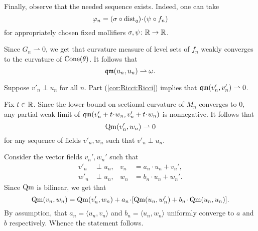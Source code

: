 Finally, observe that the needed sequence exists.
Indeed, one can take 
\[\phi_n=(\sigma\circ \dist_q)\cdot (\psi\circ f_n)\]
for appropriately chosen fixed mollifiers $\sigma,\psi\colon\mathbb{R}\to \mathbb{R}$.

Since $G_n\rightharpoonup 0$, we get that curvature measure of level sets of $f_n$ weakly converges to the curvature of $\operatorname{Cone}(\theta)$.
It follows that 
\[\operatorname{\mathfrak{qm}}(u_n,u_n)\rightharpoonup \omega.\]

Suppose $v'_n\perp u_n$ for all $n$.
Part (\ref{cor:Ricci:Ricci}) implies that  $\operatorname{\mathfrak{qm}}(v'_n,v'_n)\rightharpoonup 0$.

Fix $t\in \mathbb{R}$.
Since the lower bound on sectional curvature of $M_n$ converges to $0$, any partial weak limit of $\qm(v'_n+t\cdot w_n,v'_n+t\cdot w_n)$ is nonnegative.
It follows that 
\[\operatorname{\rm Qm}(v'_n, w_n)\rightharpoonup 0\] for any sequence of fields $v'_n,w_n$ such that $v'_n\perp u_n$.

Consider the vector fields $v_n',w_n'$ such that 
\begin{align*}
v'_n&\perp u_n,
&
v_n&=a_n\cdot u_n+v_n',
\\
w'_n&\perp u_n,
&
w_n&=b_n\cdot u_n+w_n'.
\end{align*}
Since $\operatorname{\rm Qm}$ is bilinear, we get that
\[\Qm(v_n,w_n)=\Qm(v_n',w_n) + a_n\cdot [\Qm(u_n,w_n')+ b_n\cdot \Qm(u_n,u_n)].\]
By assumption, that $a_n=\langle u_n,v_n\rangle $ and $b_n=\langle u_n,w_n\rangle$ uniformly converge to $a$ and $b$ respectively.
Whence the statement follows.
\qeds


